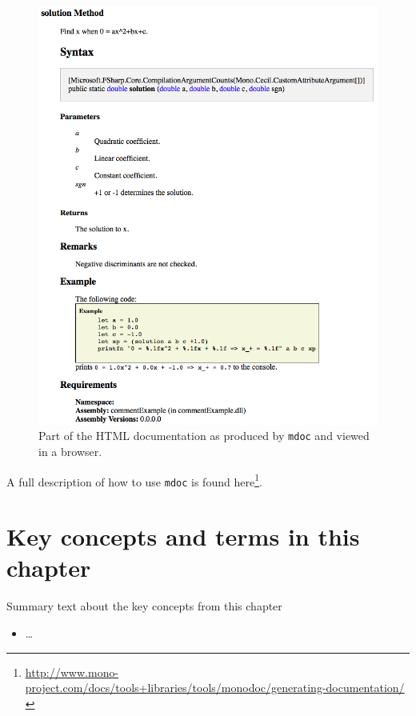 \documentclass[fsharpNotes.tex]{subfiles}
\begin{document}
\begin{figure}
  \centering
  \includegraphics[width=\linewidth]{mdocOutput}
  \caption{Part of the HTML documentation as produced by \lstinline[language=console]{mdoc} and viewed in a browser.}
  \label{fig:htmlDocumentExample}
\end{figure}
A full description of how to use \lstinline[language=console]{mdoc} is found here\footnote{\url{http://www.mono-project.com/docs/tools+libraries/tools/monodoc/generating-documentation/}}.

\section{Key concepts and terms in this chapter}
Summary text about the key concepts from this chapter
\begin{itemize}
\item \ldots
\end{itemize}
\end{document}
